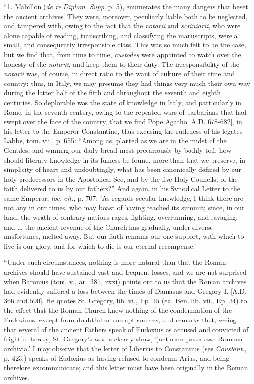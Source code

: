 ``1. Mabillon (\emph{de re Diplom. Supp}. p. 5),
enumerates the many dangers that beset the ancient archives. They
were, moreover, peculiarly liable both to be neglected, and tampered
with, owing to the fact that the \emph{notarii} and \emph{scriniarii},
who were alone capable of reading, transcribing, and classifying the
manuscripts, were a small, and consequently irresponsible class. This
was so much felt to be the case, but we find that, from time to time, \emph{custodes}
were appointed to watch over the honesty of the \emph{notarii}, and
keep them to their duty. The irresponsibility of the \emph{notarii}
was, of course, in direct ratio to the want of culture of their time
and country; thus, in Italy, we may presume they had things very much
their own way during the latter half of the fifth and throughout the
seventh and eighth centuries. So deplorable was the state of knowledge
in Italy, and particularly in Rome, in the seventh century, owing to
the repeated wars of barbarians that had swept over the face of the
country, that we find Pope Agatho [A.D.
678-682], in his letter to the Emperor Constantine, thus excusing the
rudeness of his legates Labbe, tom. vii., p. 655: ``Among us,
planted as we are in the midst of the Gentiles, and winning our daily
bread most precariously by bodily toil, how should literary knowledge
in its fulness be found, more than that we preserve, in simplicity of
heart and undoubtingly, what has been canonically defined by our holy
predecessors in the Apostolical See, and by the five Holy Councils, of
the faith delivered to us by our fathers?'' And again, in his Synodical
Letter to the same Emperor, \emph{loc. cit}., p. 707: 'As regards
secular knowledge, I think there are not any in our times, who may
boast of having reached its summit; since, in our land, the wrath of
contrary nations rages, fighting, overrunning, and ravaging; and ...
the ancient revenue of the Church has gradually, under diverse
misfortunes, melted away. But our faith remains our one support, with
which to live is our glory, and for which to die is our eternal
recompense.'

``Under such circumstances, nothing is more
natural than that the Roman archives should have sustained vast and
frequent losses, and we are not surprised when Baronius (tom. v., an.
381, xxxi) points out to us that the Roman archives had evidently
suffered a loss between the times of Damasus and Gregory I. [A.D.
366 and 590]. He quotes St. Gregory, lib. vi., Ep. 15 (ed. Ben. lib.
vii., Ep. 34) to the effect that the Roman Church knew nothing of the
condemnation of the Eudoxians, except from doubtful or corrupt
sources, and remarks that, seeing that several of the ancient Fathers
speak of Eudoxius as accused and convicted of frightful heresy, St.
Gregory's words clearly show, 'jacturam passa esse Romana archivia.' I
may observe that the letter of Liberius to Constantius (see \emph{Coustant}.,
p. 423,) speaks of Eudoxius as having refused to condemn Arius, and
being therefore excommunicate; and this letter must have been
originally in the Roman archives.

